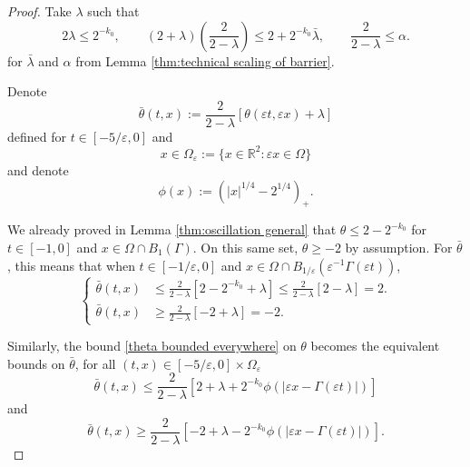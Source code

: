\documentclass[11pt]{amsart}
\theoremstyle{remark}
\theoremstyle{definition}
\newcommand{\R}{\mathbb{R}}
\newcommand{\eps}{\varepsilon}
\newcommand{\paren}[1]{\left( #1 \right)}
\newcommand{\bracket}[1]{\left[ #1 \right]}
\newcommand{\n}{^{-1}}
\newcommand{\Cgamma}{C_g}
\begin{document}

\begin{proof}
Take $\lambda$ such that
\begin{equation} \label{lambda smallness assumptions} 2\lambda \leq 2^{-k_0}, \qquad (2+\lambda)(\frac{2}{2-\lambda}) \leq 2 + 2^{-k_0} \bar{\lambda}, \qquad \frac{2}{2-\lambda} \leq \alpha. \end{equation}
for $\bar{\lambda}$ and $\alpha$ from Lemma \ref{thm:technical scaling of barrier}.  

Denote 
\[ \bar{\theta}(t,x) := \frac{2}{2-\lambda} \bracket{\theta(\eps t, \eps x) + \lambda} \]
defined for $t \in [-5/\eps,0]$ and 
\[ x \in \Omega_\eps := \{x\in \R^2: \eps x \in \Omega\} \]
and denote
\[ \phi(x) := \paren{|x|^{1/4} - 2^{1/4}}_+. \]

We already proved in Lemma \ref{thm:oscillation general} that $\theta \leq 2 - 2^{-k_0}$ for $t \in [-1,0]$ and $x \in \Omega\cap B_1(\Gamma)$.  On this same set, $\theta \geq -2$ by assumption.  For $\bar{\theta}$, this means that when $t \in [-1/\eps, 0]$ and $x \in \Omega \cap B_{1/\eps}(\eps\n \Gamma(\eps t))$,
\begin{equation}\label{bar theta bounded basin} \begin{cases}
\bar{\theta}(t,x) &\leq \frac{2}{2-\lambda} \bracket{2-2^{-k_0}+\lambda} \leq \frac{2}{2-\lambda} \bracket{2-\lambda} = 2. \\
\bar{\theta}(t,x) &\geq \frac{2}{2-\lambda} \bracket{-2+\lambda} = -2.
\end{cases} \end{equation}

Similarly, the bound \eqref{theta bounded everywhere} on $\theta$ becomes the equivalent bounds on $\bar{\theta}$, for all $(t,x) \in [-5/\eps,0] \times \Omega_\eps$
\begin{equation} \bar{\theta}(t,x) \leq \frac{2}{2-\lambda} \bracket{2 + \lambda + 2^{-k_0} \phi(|\eps x - \Gamma(\eps t)|)} \label{bar theta bounded above everywhere} \end{equation}
and
\begin{equation} \bar{\theta}(t,x) \geq \frac{2}{2-\lambda} \bracket{- 2 + \lambda - 2^{-k_0} \phi(|\eps x - \Gamma(\eps t)|)}. \label{bar theta bounded below everywhere} \end{equation}


\end{proof}
\end{document}
